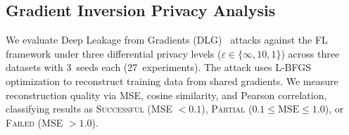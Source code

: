 \documentclass[conference,a4paper]{IEEEtran}
\begin{document}
\subsection{Gradient Inversion Privacy Analysis}
\label{sec:gradient_inversion}

We evaluate Deep Leakage from Gradients (DLG)~\cite{zhu2019deep} attacks against the FL framework under three differential privacy levels ($\varepsilon \in \{\infty, 10, 1\}$) across three datasets with 3~seeds each (27~experiments). The attack uses L-BFGS optimization to reconstruct training data from shared gradients. We measure reconstruction quality via MSE, cosine similarity, and Pearson correlation, classifying results as \textsc{Successful} (MSE $< 0.1$), \textsc{Partial} ($0.1 \leq \text{MSE} \leq 1.0$), or \textsc{Failed} (MSE $> 1.0$).
\end{document}
